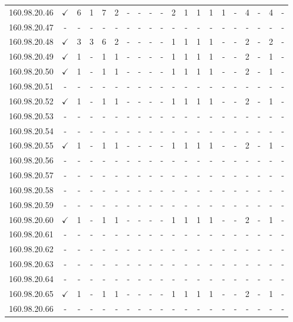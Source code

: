 \documentclass[10pt,a4paper,twoside,onecolumn]{article}
\begin{document}
\begin{table}[p]
\begin{threeparttable}
\begin{tabularx}{\textwidth}{ R | c | c c c | c c c c c | c c c c c | c c c c c }
			160.98.20.46 & $\checkmark$ & 6 & 1 & 7 & 2 & - & - & - & - & 2 & 1 & 1 & 1 & 1 & - & 4 & - & 4 & - \\
			160.98.20.47 & - & - & - & - & - & - & - & - & - & - & - & - & - & - & - & - & - & - & - \\
			160.98.20.48 & $\checkmark$ & 3 & 3 & 6 & 2 & - & - & - & - & 1 & 1 & 1 & 1 & - & - & 2 & - & 2 & - \\
			160.98.20.49 & $\checkmark$ & 1 & - & 1 & 1 & - & - & - & - & 1 & 1 & 1 & 1 & - & - & 2 & - & 1 & - \\
			160.98.20.50 & $\checkmark$ & 1 & - & 1 & 1 & - & - & - & - & 1 & 1 & 1 & 1 & - & - & 2 & - & 1 & - \\
			160.98.20.51 & - & - & - & - & - & - & - & - & - & - & - & - & - & - & - & - & - & - & - \\
			160.98.20.52 & $\checkmark$ & 1 & - & 1 & 1 & - & - & - & - & 1 & 1 & 1 & 1 & - & - & 2 & - & 1 & - \\
			160.98.20.53 & - & - & - & - & - & - & - & - & - & - & - & - & - & - & - & - & - & - & - \\
			160.98.20.54 & - & - & - & - & - & - & - & - & - & - & - & - & - & - & - & - & - & - & - \\
			160.98.20.55 & $\checkmark$ & 1 & - & 1 & 1 & - & - & - & - & 1 & 1 & 1 & 1 & - & - & 2 & - & 1 & - \\
			160.98.20.56 & - & - & - & - & - & - & - & - & - & - & - & - & - & - & - & - & - & - & - \\
			160.98.20.57 & - & - & - & - & - & - & - & - & - & - & - & - & - & - & - & - & - & - & - \\
			160.98.20.58 & - & - & - & - & - & - & - & - & - & - & - & - & - & - & - & - & - & - & - \\
			160.98.20.59 & - & - & - & - & - & - & - & - & - & - & - & - & - & - & - & - & - & - & - \\
			160.98.20.60 & $\checkmark$ & 1 & - & 1 & 1 & - & - & - & - & 1 & 1 & 1 & 1 & - & - & 2 & - & 1 & - \\
			160.98.20.61 & - & - & - & - & - & - & - & - & - & - & - & - & - & - & - & - & - & - & - \\
			160.98.20.62 & - & - & - & - & - & - & - & - & - & - & - & - & - & - & - & - & - & - & - \\
			160.98.20.63 & - & - & - & - & - & - & - & - & - & - & - & - & - & - & - & - & - & - & - \\
			160.98.20.64 & - & - & - & - & - & - & - & - & - & - & - & - & - & - & - & - & - & - & - \\
			160.98.20.65 & $\checkmark$ & 1 & - & 1 & 1 & - & - & - & - & 1 & 1 & 1 & 1 & - & - & 2 & - & 1 & - \\
			160.98.20.66 & - & - & - & - & - & - & - & - & - & - & - & - & - & - & - & - & - & - & - \\
			\hline


\end{tabularx}
\end{threeparttable}
\end{table}
\end{document}
